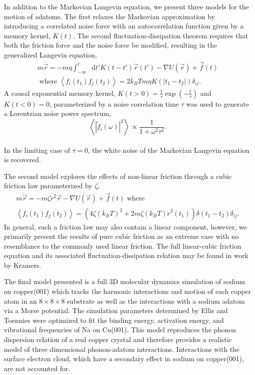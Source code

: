 \documentclass[7pt]{article}
\newcommand*{\diff}{\mathop{}\!\mathrm{d}}
\begin{document}
In addition to the Markovian Langevin equation, we present three models for the motion of adatoms. The first relaxes the Markovian approximation by introducing a correlated noise force with an autocorrelation function given by a memory kernel, $K(t)$. The second fluctuation-dissipation theorem requires that both the friction force and the noise force be modified, resulting in the generalized Langevin equation\cite{Kubo},
\begin{equation}
\begin{gathered}
	m\ddot{\vec{r}}=-m\eta\int_{-\infty}^t\diff{t'}K(t-t')\dot{\vec{r}}(t') - \nabla U(\vec{r}) + \vec{f}(t) \\
	\text{ where } \left<f_i(t_1)f_j(t_2)\right>=2k_BTm\eta K(\left|t_1-t_2\right|)\delta_{ij}.
\end{gathered}
	\label{eq:gle}
\end{equation}
A causal exponential memory kernel, $K(t>0)=\frac{1}{\tau}\exp\left(-\frac{t}{\tau}\right)$ and $K(t<0)=0$, parameterized by a noise correlation time $\tau$ was used to generate a Lorentzian noise power spectrum,
\\
\begin{equation}
	\left<|\tilde{f}_i(\omega)|^2\right> \propto \frac{1}{1 + \omega^2\tau^2}.
\end{equation}
\\
In the limiting case of $\tau=0$, the white noise of the Markovian Langevin equation is recovered. 

The second model explores the effects of non-linear friction through a cubic friction law parameterized by $\zeta$\cite{Kramers},
\begin{equation}
\begin{gathered}
	m\ddot{\vec{r}} = - m\zeta\dot{r}^2\dot{\vec{r}} - \nabla U(\vec{r}) + \vec{f}(t) \text{ where } \\
	\left<f_i(t_1)f_j(t_2)\right>=\left(4\zeta\left(k_BT\right)^2 + 2 m \zeta \left(k_BT\right)\dot{r}^2(t_1)\right)\delta\left(t_1-t_2\right)\delta_{ij}. 
\end{gathered}
\end{equation}
In general, such a friction law may also contain a linear component, however, we primarily present the results of pure cubic friction as an extreme case with no resemblance to the commonly used linear friction. The full linear-cubic friction equation and its associated fluctuation-dissipation relation may be found in work by Kramers\cite{Kramers}. 


The final model presented is a full 3D molecular dynamics simulation of sodium on copper(001) which tracks the harmonic interactions and motion of each copper atom in an $8\times8\times8$ substrate as well as the interactions with a sodium adatom via a Morse potential. The simulation parameters determined by Ellis and Toennies were optimized to fit the binding energy, activation energy, and vibrational frequencies of Na on Cu(001)\cite{Ellis}. This model reproduces the phonon dispersion relation of a real copper crystal\cite{Sinha} and therefore provides a realistic model of three dimensional phonon-adatom interactions. Interactions with the surface electron cloud, which have a secondary effect in sodium on copper(001)\cite{Rittmeyer2016}, are not accounted for.
\end{document}
